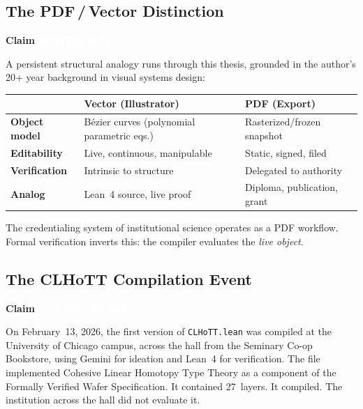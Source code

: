 \documentclass[11pt,letterpaper]{article}
\newcommand{\demonstrated}{\texorpdfstring{\colorbox{demonstrated}{\textcolor{white}{\scriptsize\textbf{\,DEMONSTRATED\,}}}}{ [DEMONSTRATED]}}
\newcommand{\motivated}{\texorpdfstring{\colorbox{motivated}{\textcolor{white}{\scriptsize\textbf{\,MOTIVATED\,}}}}{ [MOTIVATED]}}
\newenvironment{claim}[1]{%
  \par\medskip\noindent\textbf{Claim} #1\quad\itshape
}{%
  \par\medskip
}
\begin{document}
\subsection{The PDF\,/\,Vector Distinction}

\begin{claim}{\motivated}
A persistent structural analogy runs through this thesis, grounded in the author's 20+ year background in visual systems design:
\end{claim}

\begin{center}
\renewcommand{\arraystretch}{1.4}
\begin{tabular}{>{\bfseries}l p{5cm} p{5cm}}
\toprule
 & \textbf{Vector (Illustrator)} & \textbf{PDF (Export)} \\
\midrule
Object model & B\'ezier curves (polynomial parametric eqs.) & Rasterized/frozen snapshot \\
Editability & Live, continuous, manipulable & Static, signed, filed \\
Verification & Intrinsic to structure & Delegated to authority \\
Analog & Lean~4 source, live proof & Diploma, publication, grant \\
\bottomrule
\end{tabular}
\end{center}

\medskip

The credentialing system of institutional science operates as a PDF workflow. Formal verification inverts this: the compiler evaluates the \emph{live object}.

\subsection{The CLHoTT Compilation Event}

\begin{claim}{\demonstrated}
On February~13, 2026, the first version of \texttt{CLHoTT.lean} was compiled at the University of Chicago campus, across the hall from the Seminary Co-op Bookstore, using Gemini for ideation and Lean~4 for verification. The file implemented Cohesive Linear Homotopy Type Theory as a component of the Formally Verified Wafer Specification. It contained 27~layers. It compiled. The institution across the hall did not evaluate it.
\end{claim}

\end{document}
